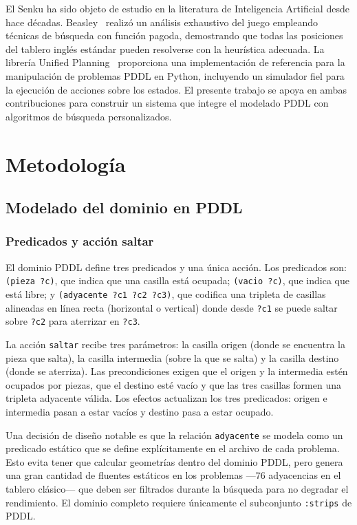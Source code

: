 \documentclass[conference,a4paper]{IEEEtran}
\begin{document}
El Senku ha sido objeto de estudio en la literatura de Inteligencia Artificial
desde hace décadas. Beasley~\cite{beasley-peg-solitaire} realizó un análisis
exhaustivo del juego empleando técnicas de búsqueda con función pagoda,
demostrando que todas las posiciones del tablero inglés estándar pueden
resolverse con la heurística adecuada. La librería Unified
Planning~\cite{unified-planning} proporciona una implementación de referencia
para la manipulación de problemas PDDL en Python, incluyendo un simulador
fiel para la ejecución de acciones sobre los estados. El presente trabajo se
apoya en ambas contribuciones para construir un sistema que integre el
modelado PDDL con algoritmos de búsqueda personalizados.


\section{Metodología}

\subsection{Modelado del dominio en PDDL}

\subsubsection{Predicados y acción saltar}

El dominio PDDL define tres predicados y una única acción. Los predicados son:
\texttt{(pieza ?c)}, que indica que una casilla está ocupada;
\texttt{(vacio ?c)}, que indica que está libre; y \texttt{(adyacente ?c1 ?c2 ?c3)},
que codifica una tripleta de casillas alineadas en línea recta (horizontal o
vertical) donde desde \texttt{?c1} se puede saltar sobre \texttt{?c2} para
aterrizar en \texttt{?c3}.

La acción \texttt{saltar} recibe tres parámetros: la casilla origen (donde se
encuentra la pieza que salta), la casilla intermedia (sobre la que se salta)
y la casilla destino (donde se aterriza). Las precondiciones exigen que el
origen y la intermedia estén ocupados por piezas, que el destino esté vacío
y que las tres casillas formen una tripleta adyacente válida. Los efectos
actualizan los tres predicados: origen e intermedia pasan a estar vacíos y
destino pasa a estar ocupado.

Una decisión de diseño notable es que la relación \texttt{adyacente} se modela
como un predicado estático que se define explícitamente en el archivo de cada
problema. Esto evita tener que calcular geometrías dentro del dominio PDDL,
pero genera una gran cantidad de fluentes estáticos en los problemas —76
adyacencias en el tablero clásico— que deben ser filtrados durante la
búsqueda para no degradar el rendimiento. El dominio completo requiere
únicamente el subconjunto \texttt{:strips} de PDDL.
\end{document}
